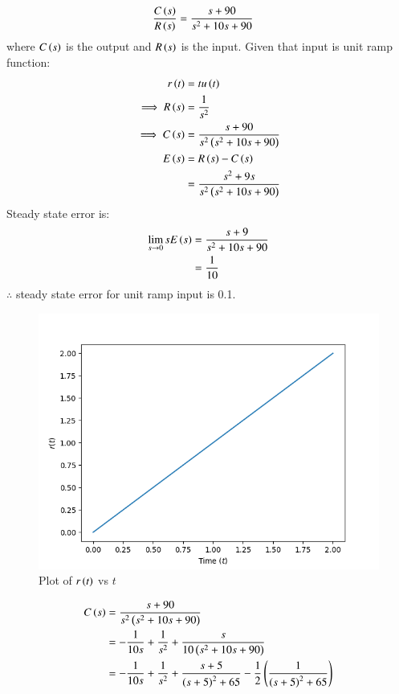 \documentclass[journal,12pt,twocolumn]{IEEEtran}
\theoremstyle{remark}
\begin{document}
\begin{align}
\frac{C\left(s\right)}{R\left(s\right)} &= \frac{s + 90}{s^2 + 10s + 90}
\end{align}
where $C\left(s\right)$ is the output and $R\left(s\right)$ is the input.
Given that input is unit ramp function:
\begin{align}
r\left(t\right) &= tu\left(t\right) \\
\implies R\left(s\right) &= \frac{1}{s^2} \\
\implies C\left(s\right) &= \frac{s + 90}{s^2\left(s^2+10s+90\right)} \\
E\left(s\right) &= R\left(s\right) - C\left(s\right) \\
&= \frac{s^2+9s}{s^2\left(s^2+10s+90\right)}
\end{align}
Steady state error is:
\begin{align}
\lim_{s\to0}{sE\left(s\right)} &= \frac{s + 9}{s^2 + 10s + 90} \\
&= \frac{1}{10}
\end{align}
$\therefore$ steady state error for unit ramp input is 0.1.
\begin{figure}[h!]
\centering
\includegraphics[width=\columnwidth]{figs/r_t.png}
\caption{Plot of $r\left(t\right)$ vs $t$}
\label{fig:2021bm46-2}
\end{figure}
\begin{align}
C\left(s\right) &= \frac{s + 90}{s^2\left(s^2+10s+90\right)} \\
&= -\frac{1}{10s} + \frac{1}{s^2} + \frac{s}{10\left(s^2 + 10s + 90\right)} \\
&= -\frac{1}{10s} + \frac{1}{s^2} + \frac{s + 5}{\left(s+5\right)^2+65} - \frac{1}{2}\left(\frac{1}{\left(s+5\right)^2+65}\right)
\end{align}
\end{document}
